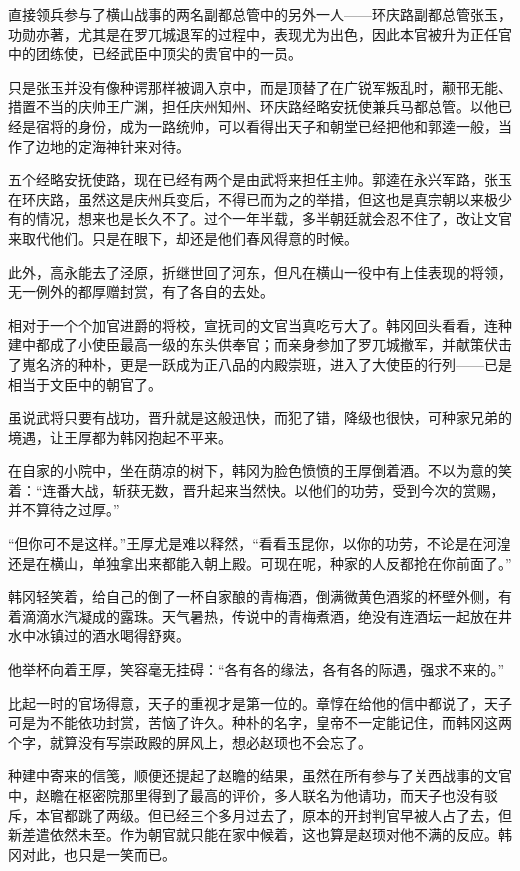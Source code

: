 直接领兵参与了横山战事的两名副都总管中的另外一人——环庆路副都总管张玉，功勋亦著，尤其是在罗兀城退军的过程中，表现尤为出色，因此本官被升为正任官中的团练使，已经武臣中顶尖的贵官中的一员。

只是张玉并没有像种谔那样被调入京中，而是顶替了在广锐军叛乱时，颟邗无能、措置不当的庆帅王广渊，担任庆州知州、环庆路经略安抚使兼兵马都总管。以他已经是宿将的身份，成为一路统帅，可以看得出天子和朝堂已经把他和郭逵一般，当作了边地的定海神针来对待。

五个经略安抚使路，现在已经有两个是由武将来担任主帅。郭逵在永兴军路，张玉在环庆路，虽然这是庆州兵变后，不得已而为之的举措，但这也是真宗朝以来极少有的情况，想来也是长久不了。过个一年半载，多半朝廷就会忍不住了，改让文官来取代他们。只是在眼下，却还是他们春风得意的时候。

此外，高永能去了泾原，折继世回了河东，但凡在横山一役中有上佳表现的将领，无一例外的都厚赠封赏，有了各自的去处。

相对于一个个加官进爵的将校，宣抚司的文官当真吃亏大了。韩冈回头看看，连种建中都成了小使臣最高一级的东头供奉官；而亲身参加了罗兀城撤军，并献策伏击了嵬名济的种朴，更是一跃成为正八品的内殿崇班，进入了大使臣的行列——已是相当于文臣中的朝官了。

虽说武将只要有战功，晋升就是这般迅快，而犯了错，降级也很快，可种家兄弟的境遇，让王厚都为韩冈抱起不平来。

在自家的小院中，坐在荫凉的树下，韩冈为脸色愤愤的王厚倒着酒。不以为意的笑着：“连番大战，斩获无数，晋升起来当然快。以他们的功劳，受到今次的赏赐，并不算待之过厚。”

“但你可不是这样。”王厚尤是难以释然，“看看玉昆你，以你的功劳，不论是在河湟还是在横山，单独拿出来都能入朝上殿。可现在呢，种家的人反都抢在你前面了。”

韩冈轻笑着，给自己的倒了一杯自家酿的青梅酒，倒满微黄色酒浆的杯壁外侧，有着滴滴水汽凝成的露珠。天气暑热，传说中的青梅煮酒，绝没有连酒坛一起放在井水中冰镇过的酒水喝得舒爽。

他举杯向着王厚，笑容毫无挂碍：“各有各的缘法，各有各的际遇，强求不来的。”

比起一时的官场得意，天子的重视才是第一位的。章惇在给他的信中都说了，天子可是为不能依功封赏，苦恼了许久。种朴的名字，皇帝不一定能记住，而韩冈这两个字，就算没有写崇政殿的屏风上，想必赵顼也不会忘了。

种建中寄来的信笺，顺便还提起了赵瞻的结果，虽然在所有参与了关西战事的文官中，赵瞻在枢密院那里得到了最高的评价，多人联名为他请功，而天子也没有驳斥，本官都跳了两级。但已经三个多月过去了，原本的开封判官早被人占了去，但新差遣依然未至。作为朝官就只能在家中候着，这也算是赵顼对他不满的反应。韩冈对此，也只是一笑而已。

